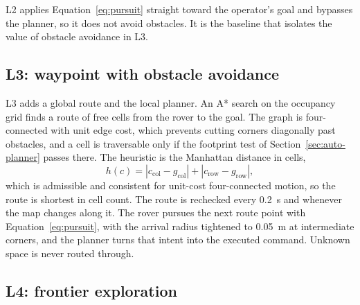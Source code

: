L2 applies Equation~\eqref{eq:pursuit} straight toward the operator's goal and bypasses the planner, so it does not avoid obstacles.
It is the baseline that isolates the value of obstacle avoidance in L3.

\subsection{L3: waypoint with obstacle avoidance}

L3 adds a global route and the local planner.
An A* search on the occupancy grid finds a route of free cells from the rover to the goal.
The graph is four-connected with unit edge cost, which prevents cutting corners diagonally past obstacles, and a cell is traversable only if the footprint test of Section~\ref{sec:auto-planner} passes there.
The heuristic is the Manhattan distance in cells,
\begin{equation}
  h(c) = |c_{\text{col}} - g_{\text{col}}| + |c_{\text{row}} - g_{\text{row}}|,
\end{equation}
which is admissible and consistent for unit-cost four-connected motion, so the route is shortest in cell count.
The route is rechecked every 0.2~s and whenever the map changes along it.
The rover pursues the next route point with Equation~\eqref{eq:pursuit}, with the arrival radius tightened to 0.05~m at intermediate corners, and the planner turns that intent into the executed command.
Unknown space is never routed through.

\subsection{L4: frontier exploration}

